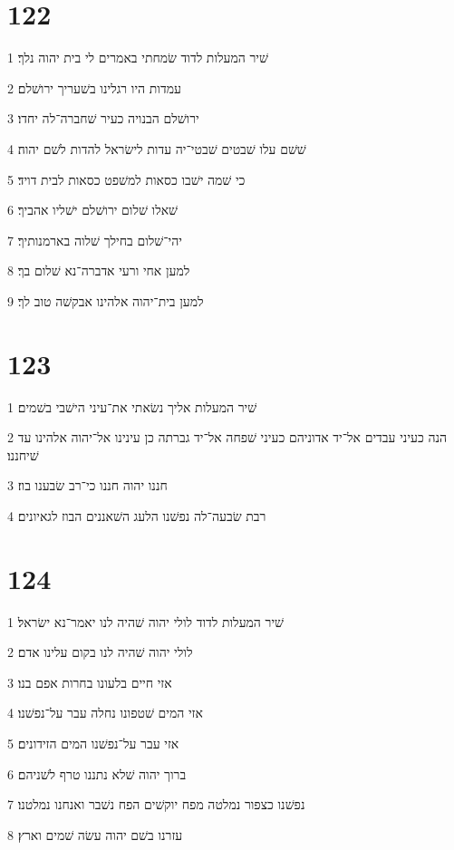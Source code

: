 \chapter{122}

\par 1 שׁיר המעלות לדוד שׂמחתי באמרים לי בית יהוה נלך׃
\par 2 עמדות היו רגלינו בשׁעריך ירושׁלם׃
\par 3 ירושׁלם הבנויה כעיר שׁחברה־לה יחדו׃
\par 4 שׁשׁם עלו שׁבטים שׁבטי־יה עדות לישׂראל להדות לשׁם יהוה׃
\par 5 כי שׁמה ישׁבו כסאות למשׁפט כסאות לבית דויד׃
\par 6 שׁאלו שׁלום ירושׁלם ישׁליו אהביך׃
\par 7 יהי־שׁלום בחילך שׁלוה בארמנותיך׃
\par 8 למען אחי ורעי אדברה־נא שׁלום בך׃
\par 9 למען בית־יהוה אלהינו אבקשׁה טוב לך׃

\chapter{123}

\par 1 שׁיר המעלות אליך נשׂאתי את־עיני הישׁבי בשׁמים׃
\par 2 הנה כעיני עבדים אל־יד אדוניהם כעיני שׁפחה אל־יד גברתה כן עינינו אל־יהוה אלהינו עד שׁיחננו׃
\par 3 חננו יהוה חננו כי־רב שׂבענו בוז׃
\par 4 רבת שׂבעה־לה נפשׁנו הלעג השׁאננים הבוז לגאיונים׃

\chapter{124}

\par 1 שׁיר המעלות לדוד לולי יהוה שׁהיה לנו יאמר־נא ישׂראל׃
\par 2 לולי יהוה שׁהיה לנו בקום עלינו אדם׃
\par 3 אזי חיים בלעונו בחרות אפם בנו׃
\par 4 אזי המים שׁטפונו נחלה עבר על־נפשׁנו׃
\par 5 אזי עבר על־נפשׁנו המים הזידונים׃
\par 6 ברוך יהוה שׁלא נתננו טרף לשׁניהם׃
\par 7 נפשׁנו כצפור נמלטה מפח יוקשׁים הפח נשׁבר ואנחנו נמלטנו׃
\par 8 עזרנו בשׁם יהוה עשׂה שׁמים וארץ׃

